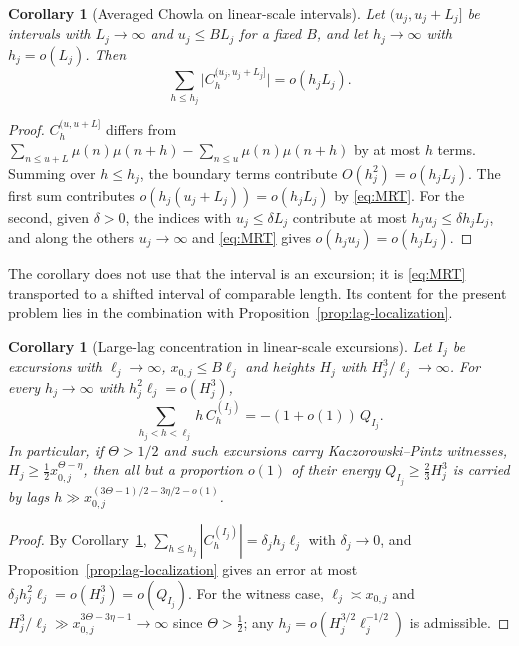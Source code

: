 \documentclass[11pt]{amsart}
\numberwithin{equation}{section}
\theoremstyle{plain}
\newtheorem{corollary}[theorem]{Corollary}
\theoremstyle{definition}
\theoremstyle{remark}
\begin{document}
\begin{corollary}[Averaged Chowla on linear-scale intervals]
\label{cor:chowla-linear}
Let $(u_j,u_j+L_j]$ be intervals with $L_j\to\infty$ and $u_j\le BL_j$ for a
fixed $B$, and let $h_j\to\infty$ with $h_j=o(L_j)$. Then
\[
\sum_{h\le h_j}\bigl|C^{(u_j,u_j+L_j]}_h\bigr|=o(h_jL_j).
\]
\end{corollary}

\begin{proof}
$C^{(u,u+L]}_h$ differs from $\sum_{n\le u+L}\mu(n)\mu(n+h)
-\sum_{n\le u}\mu(n)\mu(n+h)$ by at most $h$ terms. Summing over $h\le h_j$,
the boundary terms contribute $O(h_j^2)=o(h_jL_j)$. The first sum
contributes $o(h_j(u_j+L_j))=o(h_jL_j)$ by \eqref{eq:MRT}. For the second,
given $\delta>0$, the indices with $u_j\le\delta L_j$ contribute at most
$h_ju_j\le\delta h_jL_j$, and along the others $u_j\to\infty$ and
\eqref{eq:MRT} gives $o(h_ju_j)=o(h_jL_j)$.
\end{proof}

The corollary does not use that the interval is an excursion; it is
\eqref{eq:MRT} transported to a shifted interval of comparable length. Its
content for the present problem lies in the combination with
Proposition~\ref{prop:lag-localization}.

\begin{corollary}[Large-lag concentration in linear-scale excursions]
\label{cor:large-lag}
Let $I_j$ be excursions with $\ell_j\to\infty$, $x_{0,j}\le B\ell_j$ and
heights $H_j$ with $H_j^3/\ell_j\to\infty$. For every $h_j\to\infty$ with
$h_j^2\ell_j=o(H_j^3)$,
\[
\sum_{h_j<h<\ell_j}h\,C^{(I_j)}_h=-(1+o(1))\,Q_{I_j}.
\]
In particular, if $\Theta>1/2$ and such excursions carry
Kaczorowski--Pintz witnesses, $H_j\ge\frac12x_{0,j}^{\Theta-\eta}$, then all
but a proportion $o(1)$ of their energy $Q_{I_j}\ge\frac23H_j^3$ is carried
by lags $h\gg x_{0,j}^{(3\Theta-1)/2-3\eta/2-o(1)}$.
\end{corollary}

\begin{proof}
By Corollary~\ref{cor:chowla-linear},
$\sum_{h\le h_j}|C^{(I_j)}_h|=\delta_jh_j\ell_j$ with $\delta_j\to0$, and
Proposition~\ref{prop:lag-localization} gives an error at most
$\delta_jh_j^2\ell_j=o(H_j^3)=o(Q_{I_j})$. For the witness case,
$\ell_j\asymp x_{0,j}$ and $H_j^3/\ell_j\gg x_{0,j}^{3\Theta-3\eta-1}\to\infty$
since $\Theta>\frac12$; any $h_j=o(H_j^{3/2}\ell_j^{-1/2})$ is admissible.
\end{proof}
\end{document}

